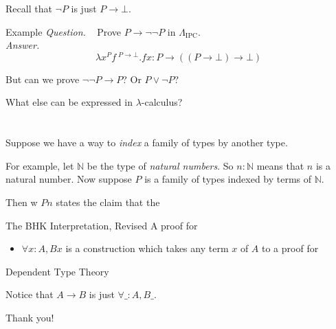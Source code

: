 \documentclass{beamer}
\begin{document}
\begin{frame}{\subIntLog}
	Recall that $\neg P$ is just $P \to \bot$.
	\begin{exampleblock}{Example}
		\emph{Question. }~ Prove $P \to \neg \neg P$ in $\Lambda_\text{IPC}$.\\
		\pause
		\emph{Answer. }\quad
		\[ \lambda x^P f~^{P \to \bot} . f x : P \to ((P \to \bot) \to \bot) \]
	\end{exampleblock}
	\pause
	But can we prove $\neg \neg P \to P$? Or $P \vee \neg P$?
\end{frame}

\begin{frame}{}
	What else can be expressed in $\lambda$-calculus?
\end{frame}

\section{\secDep}

\begin{frame}{\subDepFun}
	Suppose we have a way to \emph{index} a family of types by another type.
	
	\pause
	For example, let $\mathbb{N}$ be the type of \emph{natural numbers}. So $n : \mathbb{N}$ means that $n$ is a natural number. Now suppose $P$ is a family of types indexed by terms of $\mathbb{N}$.

	\pause
	Then w $P n$ states the claim that the 
	\begin{block}{The BHK Interpretation, Revised}
		A proof for
		\begin{itemize}
			\item $\forall x : A, B x$ is a construction which takes any term $x$ of $A$ to a proof for 
		\end{itemize}
	\end{block}
\end{frame}

\begin{frame}{\subDepFun}
	\begin{block}{Dependent Type Theory}
		\begin{prooftree}

			\noLine\BIC{}
		\end{prooftree}
	\end{block}

	\pause
	Notice that $A \to B$ is just $\forall \_ : A, B \_$.
\end{frame}




\begin{frame}[noframenumbering]{\quad}
	\begin{center}
		\Huge Thank you!
	\end{center}
\end{frame}
\end{document}
